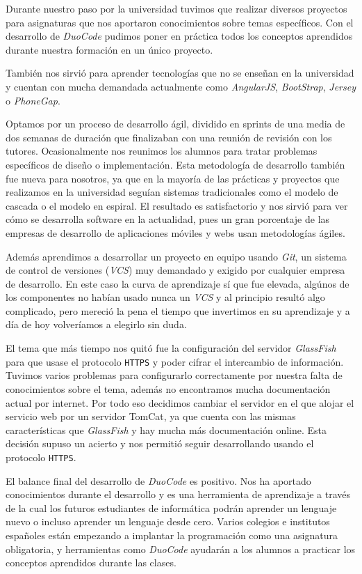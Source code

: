 Durante nuestro paso por la universidad tuvimos que realizar diversos proyectos para asignaturas que nos aportaron conocimientos sobre temas específicos. Con el desarrollo de \textit{DuoCode} pudimos poner en práctica todos los conceptos aprendidos durante nuestra formación en un único proyecto.

También nos sirvió para aprender tecnologías que no se enseñan en la universidad y cuentan con mucha demandada actualmente como \textit{AngularJS}, \textit{BootStrap}, \textit{Jersey} o \textit{PhoneGap}.

Optamos por un proceso de desarrollo ágil, dividido en sprints de una media de dos semanas de duración que finalizaban con una reunión de revisión con los tutores. Ocasionalmente nos reunimos los alumnos para tratar problemas específicos de diseño o implementación. Esta metodología de desarrollo también fue nueva para nosotros, ya que en la mayoría de las prácticas y proyectos que realizamos en la universidad seguían sistemas tradicionales como el modelo de cascada o el modelo en espiral. El resultado es satisfactorio y nos sirvió para ver cómo se desarrolla software en la actualidad, pues un gran porcentaje de las empresas de desarrollo de aplicaciones móviles y webs usan metodologías ágiles.

Además aprendimos a desarrollar un proyecto en equipo usando \textit{Git}, un sistema de control de versiones (\textit{VCS}) muy demandado y exigido por cualquier empresa de desarrollo. En este caso la curva de aprendizaje sí que fue elevada, algúnos de los componentes no habían usado nunca un \textit{VCS} y al principio resultó algo complicado, pero mereció la pena el tiempo que invertimos en su aprendizaje y a día de hoy volveríamos a elegirlo sin duda.

El tema que más tiempo nos quitó fue la configuración del servidor \textit{GlassFish} para que usase el protocolo \texttt{HTTPS} y poder cifrar el intercambio de información. Tuvimos varios problemas para configurarlo correctamente por nuestra falta de conocimientos sobre el tema, además no encontramos mucha documentación actual por internet. Por todo eso decidimos cambiar el servidor en el que alojar el servicio web por un servidor TomCat, ya que cuenta con las mismas características que \textit{GlassFish} y hay mucha más documentación online. Esta decisión supuso un acierto y nos permitió seguir desarrollando usando el protocolo \texttt{HTTPS}.

El balance final del desarrollo de \textit{DuoCode} es positivo. Nos ha aportado conocimientos durante el desarrollo y es una herramienta de aprendizaje a través de la cual los futuros estudiantes de informática podrán aprender un lenguaje nuevo o incluso aprender un lenguaje desde cero.
Varios colegios e institutos españoles están empezando a implantar la programación como una asignatura obligatoria, y herramientas como \textit{DuoCode} ayudarán a los alumnos a practicar los conceptos aprendidos durante las clases.